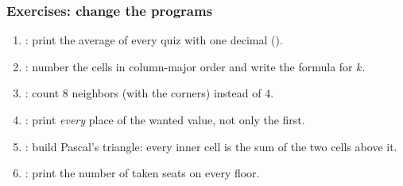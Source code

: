 \documentclass[aspectratio=169,10pt,compress]{beamer}
\begin{document}
\begin{frame}[t,fragile] \frametitle{Exercises: change the programs}
	\begin{enumerate}\small
		\item {}: print the average of every quiz with one decimal ().
		\item {}: number the cells in column-major order and write the formula for $k$.
		\item {}: count 8 neighbors (with the corners) instead of 4.
		\item {}: print \emph{every} place of the wanted value, not only the first.
		\item {}: build Pascal's triangle: every inner cell is the sum of the two cells above it.
		\item {}: print the number of taken seats on every floor.
	\end{enumerate}
\end{frame}




\begin{frame}[t,fragile]
	\begin{center}
		\vspace{4cm}
	\end{center}
\end{frame}
\end{document}
